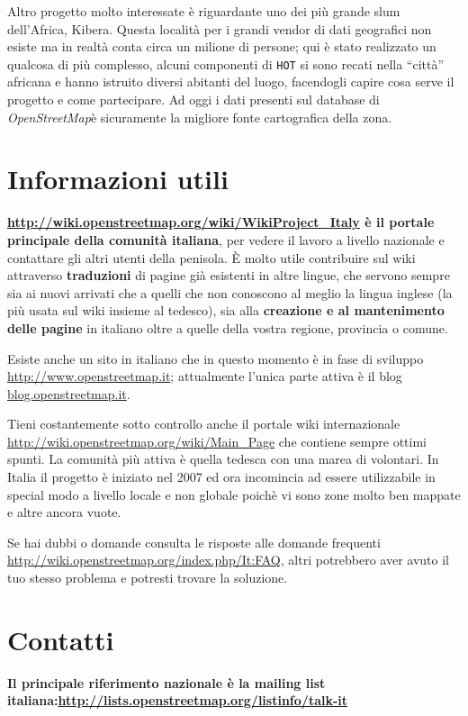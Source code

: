 \documentclass[a4paper,twoside,12pt,]{article}
\newcommand{\osm}{\emph{OpenStreetMap\xspace}}
\begin{document}
Altro progetto molto interessate è riguardante uno dei più grande slum dell'Africa, Kibera.
Questa località per i grandi vendor di dati geografici non esiste ma in realtà conta circa un milione di persone; qui è stato realizzato un qualcosa di più complesso, alcuni componenti di \texttt{HOT} si sono recati nella ``città'' africana e hanno istruito diversi abitanti del luogo, facendogli capire cosa serve il progetto e come partecipare. Ad oggi i dati presenti sul database di \osm è sicuramente la migliore fonte cartografica della zona.
\section{Informazioni utili}
\textbf{\url{http://wiki.openstreetmap.org/wiki/WikiProject_Italy} è il portale principale della comunità italiana}, per vedere il lavoro a livello nazionale e contattare gli altri utenti della penisola. È molto utile contribuire sul wiki attraverso \textbf{traduzioni} di pagine già esistenti in altre lingue, che servono sempre sia ai nuovi arrivati che a quelli che non conoscono al meglio la lingua inglese (la più usata sul wiki insieme al tedesco), sia alla \textbf{creazione e al mantenimento delle pagine} in italiano oltre a quelle della vostra regione, provincia o comune.

Esiste anche un sito in italiano che in questo momento è in fase di sviluppo \url{http://www.openstreetmap.it}; attualmente l'unica parte attiva è il blog \url{blog.openstreetmap.it}.

Tieni costantemente sotto controllo anche il portale wiki internazionale \url{http://wiki.openstreetmap.org/wiki/Main_Page} che contiene sempre ottimi spunti.  La comunità più attiva è quella tedesca con una marea di volontari. In Italia il progetto è iniziato nel 2007 ed ora incomincia ad essere utilizzabile in special modo a livello locale e non globale poichè vi sono zone molto ben mappate e altre ancora vuote.

Se hai dubbi o domande consulta le risposte alle domande frequenti \url{http://wiki.openstreetmap.org/index.php/It:FAQ}, altri potrebbero aver avuto il tuo stesso problema e potresti trovare la soluzione.
\section{Contatti}
\textbf{Il principale riferimento nazionale è la mailing list italiana:\newline \url{http://lists.openstreetmap.org/listinfo/talk-it}}
\end{document}
